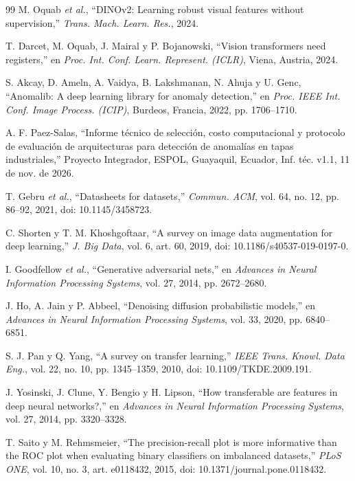 \documentclass[12pt,oneside]{report}
\begin{document}
\begin{thebibliography}{99}
 M. Oquab \textit{et al.}, ``DINOv2: Learning robust visual features without supervision,'' \textit{Trans. Mach. Learn. Res.}, 2024.

 T. Darcet, M. Oquab, J. Mairal y P. Bojanowski, ``Vision transformers need registers,'' en \textit{Proc. Int. Conf. Learn. Represent. (ICLR)}, Viena, Austria, 2024.

 S. Akcay, D. Ameln, A. Vaidya, B. Lakshmanan, N. Ahuja y U. Genc, ``Anomalib: A deep learning library for anomaly detection,'' en \textit{Proc. IEEE Int. Conf. Image Process. (ICIP)}, Burdeos, Francia, 2022, pp. 1706--1710.

 A. F. Paez-Salas, ``Informe técnico de selección, costo computacional y protocolo de evaluación de arquitecturas para detección de anomalías en tapas industriales,'' Proyecto Integrador, ESPOL, Guayaquil, Ecuador, Inf. téc. v1.1, 11 de nov. de 2026.

 T. Gebru \textit{et al.}, ``Datasheets for datasets,'' \textit{Commun. ACM}, vol. 64, no. 12, pp. 86--92, 2021, doi: 10.1145/3458723.

 C. Shorten y T. M. Khoshgoftaar, ``A survey on image data augmentation for deep learning,'' \textit{J. Big Data}, vol. 6, art. 60, 2019, doi: 10.1186/s40537-019-0197-0.

 I. Goodfellow \textit{et al.}, ``Generative adversarial nets,'' en \textit{Advances in Neural Information Processing Systems}, vol. 27, 2014, pp. 2672--2680.

 J. Ho, A. Jain y P. Abbeel, ``Denoising diffusion probabilistic models,'' en \textit{Advances in Neural Information Processing Systems}, vol. 33, 2020, pp. 6840--6851.

 S. J. Pan y Q. Yang, ``A survey on transfer learning,'' \textit{IEEE Trans. Knowl. Data Eng.}, vol. 22, no. 10, pp. 1345--1359, 2010, doi: 10.1109/TKDE.2009.191.

 J. Yosinski, J. Clune, Y. Bengio y H. Lipson, ``How transferable are features in deep neural networks?,'' en \textit{Advances in Neural Information Processing Systems}, vol. 27, 2014, pp. 3320--3328.

 T. Saito y M. Rehmsmeier, ``The precision-recall plot is more informative than the ROC plot when evaluating binary classifiers on imbalanced datasets,'' \textit{PLoS ONE}, vol. 10, no. 3, art. e0118432, 2015, doi: 10.1371/journal.pone.0118432.


\end{thebibliography}
\end{document}
